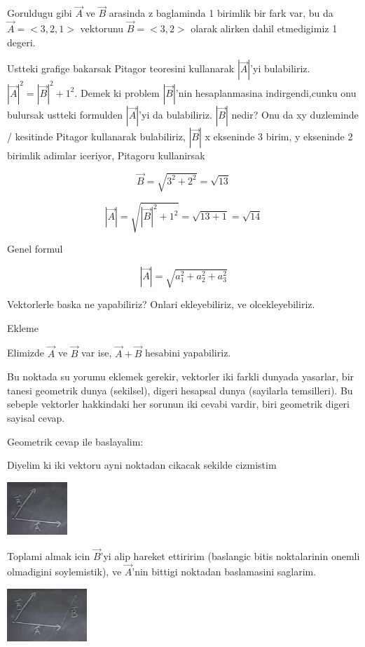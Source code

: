 \documentclass[12pt,fleqn]{article}
\begin{document}
Goruldugu gibi $\vec{A}$ ve $\vec{B}$ arasinda z baglaminda 1 birimlik bir
fark var, bu da $\vec{A} = <3,2,1>$ vektorunu $\vec{B}=<3,2>$ olarak
alirken dahil etmedigimiz 1 degeri.

Ustteki grafige bakarsak Pitagor teoresini kullanarak $|\vec{A}|$'yi
bulabiliriz. $|\vec{A}|^2 = |\vec{B}|^2 + 1^2$. Demek ki problem
$|\vec{B}|$'nin hesaplanmasina indirgendi,cunku onu bulursak ustteki
formulden $|\vec{A}|$'yi da bulabiliriz. $|\vec{B}|$ nedir? Onu da xy
duzleminde / kesitinde Pitagor kullanarak bulabiliriz, $|\vec{B}|$ x
ekseninde 3 birim, y ekseninde 2 birimlik adimlar iceriyor, Pitagoru
kullanirsak

\[  \vec{B} = \sqrt{3^2 + 2^2} = \sqrt{13} \]

\[ |\vec{A}| = \sqrt{|\vec{B}|^2 + 1^2} = \sqrt{13 + 1} = \sqrt{14} \]

Genel formul

\[ |\vec{A}| = \sqrt{a_1 ^2 + a_2^2 + a_3^2} \]

Vektorlerle baska ne yapabiliriz? Onlari ekleyebiliriz, ve
olcekleyebiliriz. 

Ekleme

Elimizde $\vec{A}$ ve $\vec{B}$ var ise, $\vec{A} + \vec{B}$ hesabini yapabiliriz. 

Bu noktada su yorumu eklemek gerekir, vektorler iki farkli dunyada
yasarlar, bir tanesi geometrik dunya (sekilsel), digeri hesapsal dunya
(sayilarla temsilleri). Bu sebeple vektorler hakkindaki her sorunun iki
cevabi vardir, biri geometrik digeri sayisal cevap.

Geometrik cevap ile baslayalim: 

Diyelim ki iki vektoru ayni noktadan cikacak sekilde cizmistim

\includegraphics[height=2cm]{1_6.png}

Toplami almak icin $\vec{B}$'yi alip hareket ettiririm (baslangic bitis
noktalarinin onemli olmadigini soylemistik), ve $\vec{A}$'nin bittigi
noktadan baslamasini saglarim.

\includegraphics[height=2cm]{1_7.png}
\end{document}
